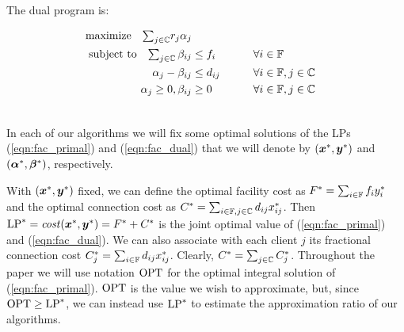 \documentclass[oneside,final]{ucr}
\begin{document}

\noindent
The dual program is:

\begin{alignat}{3}
  \textrm{maximize}\quad \textstyle{\sum_{j\in \mathbb{C}}} r_j\alpha_j&\label{eqn:fac_dual}  
     						\\ \notag
  \textrm{subject to} \quad \textstyle{
    \sum_{j\in \mathbb{C}}\beta_{ij}} &\leq f_i  &\quad\quad			&\forall i \in \mathbb{F}  
							\\ \notag
  \alpha_{j} - \beta_{ij} 	&\leq  d_{ij}       &                 & \forall i\in \mathbb{F}, j\in \mathbb{C} 
							\\ \notag
  \alpha_j \geq 0, \beta_{ij} &\geq 0           &            & \forall i\in \mathbb{F}, j\in \mathbb{C}
  							\\ \notag
\end{alignat}

In each of our algorithms we will fix some optimal
solutions of the LPs (\ref{eqn:fac_primal}) and (\ref{eqn:fac_dual})
that we will denote by $(\boldsymbol{x}^\ast, \boldsymbol{y}^\ast)$ and
$(\boldsymbol{\alpha}^\ast,\boldsymbol{\beta}^\ast)$, respectively.

With $(\boldsymbol{x}^\ast, \boldsymbol{y}^\ast)$ fixed, we can define the
optimal facility cost as $F^\ast=\sum_{i\in\mathbb{F}} f_i
y_i^\ast$ and the optimal connection cost as $C^\ast =
\sum_{i\in\mathbb{F},j\in\mathbb{C}} d_{ij}x_{ij}^\ast$.
Then $\mbox{\rm LP}^\ast = {\it cost}(\boldsymbol{x}^\ast,\boldsymbol{y}^\ast) = F^\ast+C^\ast$
is the joint optimal value of (\ref{eqn:fac_primal}) and
(\ref{eqn:fac_dual}).  We can also associate with each
client $j$ its fractional connection cost $C^\ast_j =
\sum_{i\in\mathbb{F}} d_{ij}x_{ij}^\ast$.  Clearly, $C^\ast =
\sum_{j\in\mathbb{C}} C^\ast_j$.  Throughout the paper we
will use notation $\mbox{\rm OPT}$ for the optimal integral solution
of (\ref{eqn:fac_primal}).  $\mbox{\rm OPT}$ is the value we wish to
approximate, but, since $\mbox{\rm OPT}\ge\mbox{\rm LP}^\ast$, we can instead use
$\mbox{\rm LP}^\ast$ to estimate the approximation ratio of our
algorithms.

\end{document}

